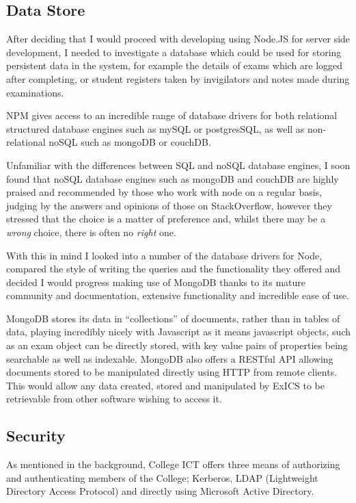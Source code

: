 \subsection{Data Store}

After deciding that I would proceed with developing using Node.JS for server side development, I needed to investigate a database which could be used for storing persistent data in the system, for example the details of exams which are logged after completing, or student registers taken by invigilators and notes made during examinations.

NPM gives access to an incredible range of database drivers for both relational structured database engines such as mySQL or postgresSQL, as well as non-relational noSQL such as mongoDB or couchDB.

Unfamiliar with the differences between SQL and noSQL database engines, I soon found that noSQL database engines such as mongoDB and couchDB are highly praised and recommended by those who work with node on a regular basis, judging by the answers and opinions of those on StackOverflow, however they stressed that the choice is a matter of preference and, whilst there may be a \textit{wrong} choice, there is often no \textit{right} one.\cite{databaseChoice}

With this in mind I looked into a number of the database drivers for Node, compared the style of writing the queries and the functionality they offered and decided I would progress making use of MongoDB thanks to its mature community and documentation, extensive functionality and incredible ease of use.

MongoDB stores its data in ``collections'' of documents, rather than in tables of data, playing incredibly nicely with Javascript as it means javascript objects, such as an exam object can be directly stored, with key value pairs of properties being searchable as well as indexable.  MongoDB also offers a RESTful API allowing documents stored to be manipulated directly using HTTP from remote clients.  This would allow any data created, stored and manipulated by ExICS to be retrievable from other software wishing to access it.

\subsection{Security}

As mentioned in the background, College ICT offers three means of authorizing and authenticating members of the College; Kerberos, LDAP (Lightweight Directory Access Protocol) and directly using Microsoft Active Directory.

